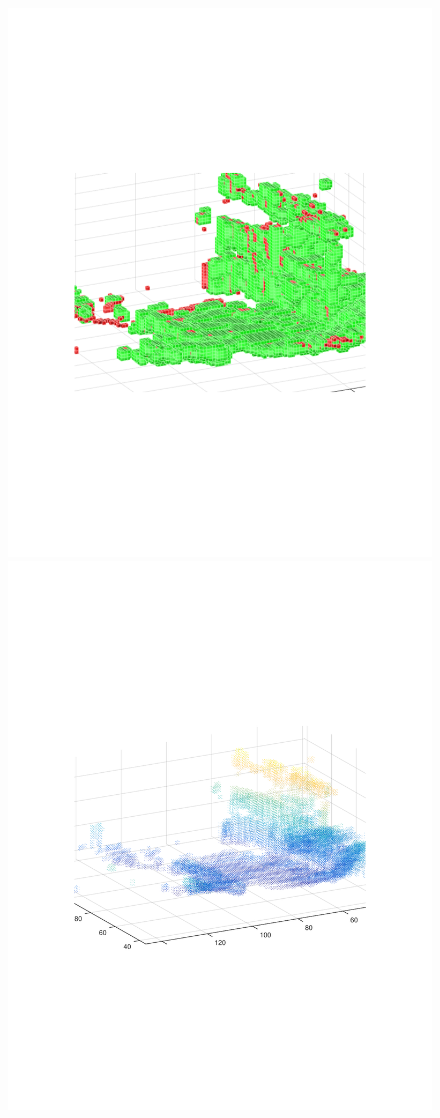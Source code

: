 \documentclass{UCF_ETD}
\begin{document}
\begin{figure}[H]
\begin{center}
\includegraphics[scale=0.58]{RobustRegistration/Scan13_14CloseUpIntensityRegistered}
\includegraphics[scale=0.58]{RobustRegistration/Scan13_14CloseUpICPRegistered}

\end{center}
\end{figure}
\end{document}
